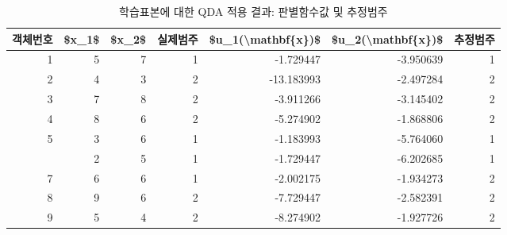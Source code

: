 \documentclass[
]{book}
\newenvironment{Shaded}{\begin{snugshade}}{\end{snugshade}}
\newcommand{\AttributeTok}[1]{\textcolor[rgb]{0.77,0.63,0.00}{#1}}
\newcommand{\ConstantTok}[1]{\textcolor[rgb]{0.00,0.00,0.00}{#1}}
\newcommand{\DecValTok}[1]{\textcolor[rgb]{0.00,0.00,0.81}{#1}}
\newcommand{\FunctionTok}[1]{\textcolor[rgb]{0.00,0.00,0.00}{#1}}
\newcommand{\NormalTok}[1]{#1}
\newcommand{\SpecialCharTok}[1]{\textcolor[rgb]{0.00,0.00,0.00}{#1}}
\newcommand{\StringTok}[1]{\textcolor[rgb]{0.31,0.60,0.02}{#1}}
\begin{document}
\begin{Shaded}
\end{Shaded}

\begin{table}

\caption{\label{tab:qda-discriminant-result}학습표본에 대한 QDA 적용 결과: 판별함수값 및 추정범주}
\centering
\begin{tabular}[t]{rrrrrrr}
\toprule
객체번호 & \$x\_1\$ & \$x\_2\$ & 실제범주 & \$u\_1(\textbackslash{}mathbf\{x\})\$ & \$u\_2(\textbackslash{}mathbf\{x\})\$ & 추정범주\\
\midrule
1 & 5 & 7 & 1 & -1.729447 & -3.950639 & 1\\
2 & 4 & 3 & 2 & -13.183993 & -2.497284 & 2\\
3 & 7 & 8 & 2 & -3.911266 & -3.145402 & 2\\
4 & 8 & 6 & 2 & -5.274902 & -1.868806 & 2\\
5 & 3 & 6 & 1 & -1.183993 & -5.764060 & 1\\
\addlinespace
6 & 2 & 5 & 1 & -1.729447 & -6.202685 & 1\\
7 & 6 & 6 & 1 & -2.002175 & -1.934273 & 2\\
8 & 9 & 6 & 2 & -7.729447 & -2.582391 & 2\\
9 & 5 & 4 & 2 & -8.274902 & -1.927726 & 2\\
\bottomrule
\end{tabular}
\end{table}
\end{document}
